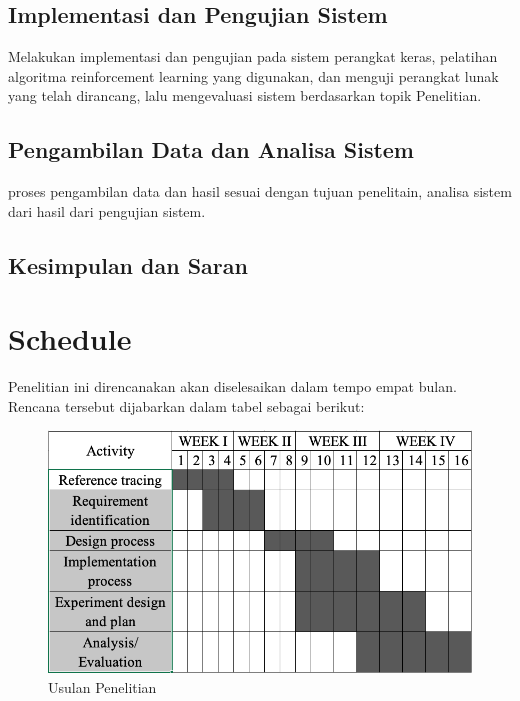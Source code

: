 \subsection{Implementasi dan Pengujian Sistem}
Melakukan implementasi dan pengujian pada sistem perangkat keras,
pelatihan algoritma reinforcement learning yang digunakan, 
dan menguji perangkat lunak yang telah dirancang, lalu mengevaluasi sistem
berdasarkan topik Penelitian.


\subsection{Pengambilan Data dan Analisa Sistem}
proses pengambilan data dan hasil sesuai dengan tujuan penelitain,
analisa sistem dari hasil dari pengujian sistem.
\subsection{Kesimpulan dan Saran}

\section{Schedule}


Penelitian ini direncanakan akan diselesaikan dalam tempo empat bulan. Rencana tersebut dijabarkan dalam tabel sebagai berikut:








\begin{figure}[H]
	\centering
	\includegraphics[width=0.9\linewidth]{figure/Chart-ThesisQ.png}
	\caption{Usulan Penelitian}
	\label{fig:chart-thesisq}
\end{figure}





